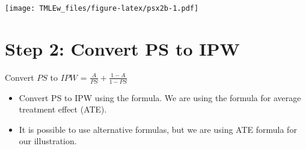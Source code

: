 \documentclass[
]{book}
\newenvironment{Shaded}{\begin{snugshade}}{\end{snugshade}}
\newcommand{\AttributeTok}[1]{\textcolor[rgb]{0.77,0.63,0.00}{#1}}
\newcommand{\DecValTok}[1]{\textcolor[rgb]{0.00,0.00,0.81}{#1}}
\newcommand{\FunctionTok}[1]{\textcolor[rgb]{0.00,0.00,0.00}{#1}}
\newcommand{\NormalTok}[1]{#1}
\newcommand{\OtherTok}[1]{\textcolor[rgb]{0.56,0.35,0.01}{#1}}
\newcommand{\SpecialCharTok}[1]{\textcolor[rgb]{0.00,0.00,0.00}{#1}}
\newcommand{\StringTok}[1]{\textcolor[rgb]{0.31,0.60,0.02}{#1}}
\providecommand{\tightlist}{%
  \setlength{\itemsep}{0pt}\setlength{\parskip}{0pt}}
\begin{document}
\begin{Shaded}
\end{Shaded}

\texttt{[image: TMLEw\_files/figure-latex/psx2b-1.pdf]}

\hypertarget{step-2-convert-ps-to-ipw}{%
\section{Step 2: Convert PS to IPW}\label{step-2-convert-ps-to-ipw}}

\begin{rmdcomment}
Convert \(PS\) to \(IPW\) = \(\frac{A}{PS} + \frac{1-A}{1-PS}\)
\end{rmdcomment}

\begin{itemize}
\tightlist
\item
  Convert PS to IPW using the formula. We are using the formula for average treatment effect (ATE).
\item
  It is possible to use alternative formulas, but we are using ATE formula for our illustration.
\end{itemize}

\begin{Shaded}
\end{Shaded}
\end{document}
